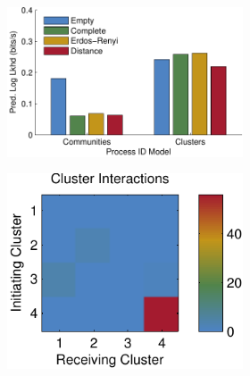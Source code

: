 \begin{figure}[!t]
\begin{center}
\begin{subfigure}[T]{.32\textwidth}
\begin{subfigure}[T]{\textwidth}
\begin{center}
\includegraphics[width=\linewidth]{figures/ch2/icpsr_pred_ll}
\caption{}
\label{fig:chicago_predll}
\end{center}
\end{subfigure}
\begin{subfigure}[B]{\textwidth}
\vspace{1em}
\begin{center}
\includegraphics[width=.7\linewidth]{figures/ch2/icpsr_interactions}\\
\caption{}
\label{fig:chicago_interactions}
\end{center}
\end{subfigure}
\end{subfigure}
\begin{subfigure}[B]{.32\textwidth}

\end{subfigure}
\end{center}
\end{figure}

